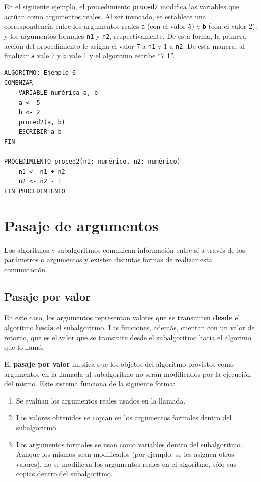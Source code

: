 \documentclass[]{book}
\providecommand{\tightlist}{%
  \setlength{\itemsep}{0pt}\setlength{\parskip}{0pt}}
\begin{document}
En el siguiente ejemplo, el procedimiento \texttt{proced2} modifica las
variables que actúan como argumentos reales. Al ser invocado, se
establece una correspondencia entre los argumentos reales \texttt{a}
(con el valor 5) y \texttt{b} (con el valor 2), y los argumentos
formales \texttt{n1} y \texttt{n2}, respectivamente. De esta forma, la
primera acción del procedimiento le asigna el valor 7 a \texttt{n1} y 1
a \texttt{n2}. De esta manera, al finalizar \texttt{a} vale 7 y
\texttt{b} vale 1 y el algoritmo escribe ``7 1''.

\begin{verbatim}
ALGORITMO: Ejemplo 6
COMENZAR
    VARIABLE numérica a, b
    a <- 5
    b <- 2
    proced2(a, b)
    ESCRIBIR a b
FIN

PROCEDIMIENTO proced2(n1: numérico, n2: numérico)
    n1 <- n1 + n2
    n2 <- n2 - 1
FIN PROCEDIMIENTO
\end{verbatim}

\section{Pasaje de argumentos}\label{pasaje-de-argumentos}

Los algoritmos y subalgoritmos comunican información entre sí a través
de los parámetros o argumentos y existen distintas formas de realizar
esta comunicación.

\subsection{Pasaje por valor}\label{pasaje-por-valor}

En este caso, los argumentos representan valores que se transmiten
\textbf{desde} el algoritmo \textbf{hacia} el subalgoritmo. Las
funciones, además, cuentan con un valor de retorno, que es el valor que
se transmite desde el subalgoritmo hacia el algorimo que lo llamó.

El \textbf{pasaje por valor} implica que los objetos del algoritmo
provistos como argumentos en la llamada al subalgoritmo no serán
modificados por la ejecución del mismo. Este sistema funciona de la
siguiente forma:

\begin{enumerate}
\def\labelenumi{\arabic{enumi}.}
\tightlist
\item
  Se evalúan los argumentos reales usados en la llamada.
\item
  Los valores obtenidos se copian en los argumentos formales dentro del
  subalgoritmo.
\item
  Los argumentos formales se usan como variables dentro del
  subalgoritmo. Aunque los mismos sean modificados (por ejemplo, se les
  asignen otros valores), no se modifican los argumentos reales en el
  algoritmo, sólo sus copias dentro del subalgoritmo.
\end{enumerate}
\end{document}
